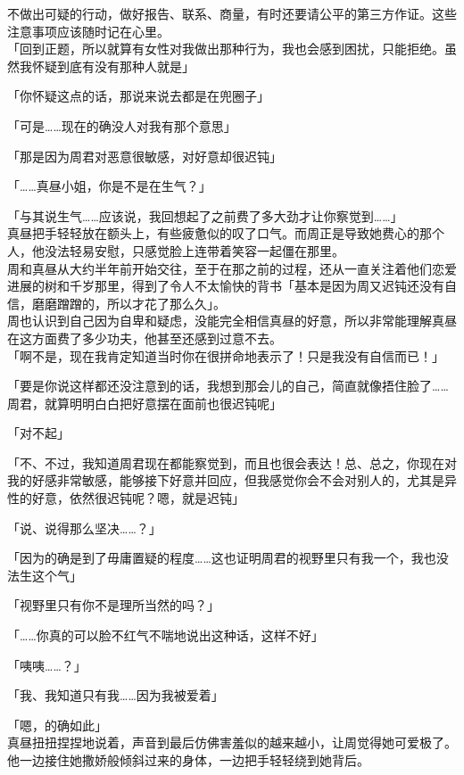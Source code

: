 不做出可疑的行动，做好报告、联系、商量，有时还要请公平的第三方作证。这些注意事项应该随时记在心里。\\

「回到正题，所以就算有女性对我做出那种行为，我也会感到困扰，只能拒绝。虽然我怀疑到底有没有那种人就是」

「你怀疑这点的话，那说来说去都是在兜圈子」

「可是……现在的确没人对我有那个意思」

「那是因为周君对恶意很敏感，对好意却很迟钝」

「……真昼小姐，你是不是在生气？」

「与其说生气……应该说，我回想起了之前费了多大劲才让你察觉到……」\\

真昼把手轻轻放在额头上，有些疲惫似的叹了口气。而周正是导致她费心的那个人，他没法轻易安慰，只感觉脸上连带着笑容一起僵在那里。\\

周和真昼从大约半年前开始交往，至于在那之前的过程，还从一直关注着他们恋爱进展的树和千岁那里，得到了令人不太愉快的背书「基本是因为周又迟钝还没有自信，磨磨蹭蹭的，所以才花了那么久」。\\

周也认识到自己因为自卑和疑虑，没能完全相信真昼的好意，所以非常能理解真昼在这方面费了多少功夫，他甚至还感到过意不去。\\

「啊不是，现在我肯定知道当时你在很拼命地表示了！只是我没有自信而已！」

「要是你说这样都还没注意到的话，我想到那会儿的自己，简直就像捂住脸了……周君，就算明明白白把好意摆在面前也很迟钝呢」

「对不起」

「不、不过，我知道周君现在都能察觉到，而且也很会表达！总、总之，你现在对我的好感非常敏感，能够接下好意并回应，但我感觉你会不会对别人的，尤其是异性的好意，依然很迟钝呢？嗯，就是迟钝」

「说、说得那么坚决……？」

「因为的确是到了毋庸置疑的程度……这也证明周君的视野里只有我一个，我也没法生这个气」

「视野里只有你不是理所当然的吗？」

「……你真的可以脸不红气不喘地说出这种话，这样不好」

「咦咦……？」

「我、我知道只有我……因为我被爱着」

「嗯，的确如此」\\

真昼扭扭捏捏地说着，声音到最后仿佛害羞似的越来越小，让周觉得她可爱极了。他一边接住她撒娇般倾斜过来的身体，一边把手轻轻绕到她背后。\\

